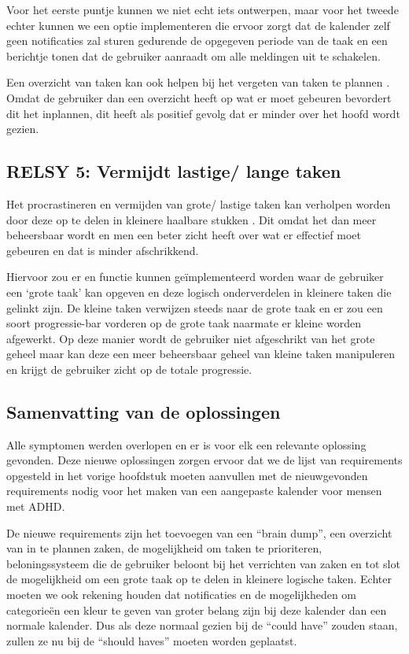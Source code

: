 Voor het eerste puntje kunnen we niet echt iets ontwerpen, maar voor het tweede echter kunnen we een optie implementeren die ervoor zorgt dat de kalender zelf geen notificaties zal sturen gedurende de opgegeven periode van de taak en een berichtje tonen dat de gebruiker aanraadt om alle meldingen uit te schakelen. \newline

Een overzicht van taken kan ook helpen bij het vergeten van taken te plannen \autocite{morris2004cognitive}. Omdat de gebruiker dan een overzicht heeft op wat er moet gebeuren bevordert dit het inplannen, dit heeft als positief gevolg dat er minder over het hoofd wordt gezien. 

\subsection{RELSY 5: Vermijdt lastige/ lange taken}
Het procrastineren en vermijden van grote/ lastige taken kan verholpen worden door deze op te delen in kleinere haalbare stukken \autocite{gupta2023understanding}. Dit omdat het dan meer beheersbaar wordt en men een beter zicht heeft over wat er effectief moet gebeuren en dat is minder afschrikkend.  \newline

Hiervoor zou er en functie kunnen geïmplementeerd worden waar de gebruiker een ‘grote taak’ kan opgeven en deze logisch onderverdelen in kleinere taken die gelinkt zijn. De kleine taken verwijzen steeds naar de grote taak en er zou een soort progressie-bar vorderen op de grote taak naarmate er kleine worden afgewerkt. 
Op deze manier wordt de gebruiker niet afgeschrikt van het grote geheel maar kan deze een meer beheersbaar geheel van kleine taken manipuleren en krijgt de gebruiker zicht op de totale progressie. 

\subsection{Samenvatting van de oplossingen}
Alle symptomen werden overlopen en er is voor elk een relevante oplossing gevonden. Deze nieuwe oplossingen zorgen ervoor dat we de lijst van requirements opgesteld in het vorige hoofdstuk moeten aanvullen met de nieuwgevonden requirements nodig voor het maken van een aangepaste kalender voor mensen met ADHD. \newline
  
De nieuwe requirements zijn het toevoegen van een “brain dump”, een overzicht van in te plannen zaken, de mogelijkheid om taken te prioriteren, beloningssysteem die de gebruiker beloont bij het verrichten van zaken en tot slot de mogelijkheid om een grote taak op te delen in kleinere logische taken. Echter moeten we ook rekening houden dat notificaties en de mogelijkheden om categorieën een kleur te geven van groter belang zijn bij deze kalender dan een normale kalender. Dus als deze normaal gezien bij de “could have” zouden staan, zullen ze nu bij de “should haves” moeten worden geplaatst.\newline

